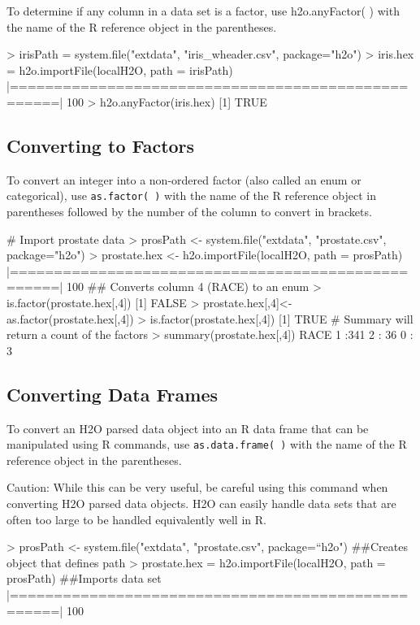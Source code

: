 \documentclass[11pt]{article}
\begin{document}
{To determine if any column in a data set is a factor, use h2o.anyFactor( ) with the name of the R reference object in the parentheses. 
\begin{spverbatim}
> irisPath = system.file("extdata", "iris_wheader.csv", package="h2o")
> iris.hex = h2o.importFile(localH2O, path = irisPath)
|===================================================| 100%
> h2o.anyFactor(iris.hex)
[1] TRUE
\end{spverbatim}

\subsection{Converting to Factors}

To convert an integer into a non-ordered factor (also called an enum or categorical), use {\texttt{as.factor( )}} with the name of the R reference object in parentheses followed by the number of the column to convert in brackets. 
\begin{spverbatim}
# Import prostate data
> prosPath <- system.file("extdata", "prostate.csv", package="h2o")
> prostate.hex <- h2o.importFile(localH2O, path = prosPath)
|===================================================| 100%
## Converts column 4 (RACE) to an enum
> is.factor(prostate.hex[,4])
[1] FALSE
> prostate.hex[,4]<-as.factor(prostate.hex[,4]) 
> is.factor(prostate.hex[,4])
[1] TRUE
# Summary will return a count of the factors
> summary(prostate.hex[,4])
 RACE   
 1 :341 
 2 : 36 
 0 :  3 
\end{spverbatim}


\subsection{Converting Data Frames}

To convert an H2O parsed data object into an R data frame that can be manipulated using R commands, use {\texttt{as.data.frame( )}} with the name of the R reference object in the parentheses.

Caution: While this can be very useful, be careful using this command when converting H2O parsed data objects. H2O can easily handle data sets that are often too large to be handled equivalently well in R. 

\begin{spverbatim}
> prosPath <- system.file("extdata", "prostate.csv", package=“h2o")
##Creates object that defines path
 > prostate.hex = h2o.importFile(localH2O, path = prosPath)
##Imports data set
  |===================================================| 100%


\end{spverbatim}}
\end{document}
